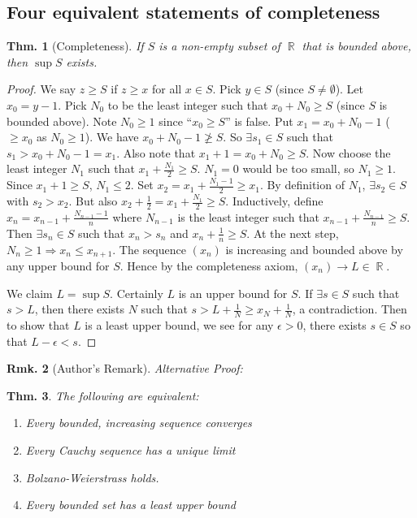 \documentclass[12pt, a4paper]{book}
\DeclareMathOperator{\R}{\mathbb{R}}
\newtheorem{theorem}{Thm.}[section]
\newtheorem{remark}[theorem]{Rmk.}
\theoremstyle{nonumberplain}
\newtheorem{proof}{Proof}
\begin{document}
\subsection{Four equivalent statements of completeness}
\begin{theorem}[Completeness]
    If $S$ is a non-empty subset of $\R$ that is bounded above, then $\sup S$ exists.
\end{theorem}
\begin{proof}
    We say $z\geq S$ if $z\geq x$ for all $x\in S$. Pick $y\in S$ (since $S\neq\emptyset$). Let $x_0=y-1$. Pick $N_0$ to
    be the least integer such that $x_0+N_0\geq S$ (since $S$ is bounded above). Note $N_0\geq 1$ since ``$x_0\geq S$''
    is false. Put $x_1=x_0+N_0-1$ ($\geq x_0$ as $N_0\geq 1$). We have $x_0+N_0-1\not\geq S$. So $\exists s_1\in S$ such
    that $s_1>x_0+N_0-1=x_1$. Also note that $x_1+1=x_0+N_0\geq S$. Now choose the least integer $N_1$ such that $x_1+\frac{N_1}{2}\geq S$.
    $N_1=0$ would be too small, so $N_1\geq 1$. Since $x_1+1\geq S$, $N_1\leq 2$. Set $x_2=x_1+\frac{N_1-1}{2}\geq x_1$.
    By definition of $N_1$, $\exists s_2\in S$ with $s_2>x_2$. But also $x_2+\frac{1}{2}=x_1+\frac{N_1}{2}\geq S$.
    Inductively, define $x_n=x_{n-1}+\frac{N_{n-1}-1}{n}$ where $N_{n-1}$ is the least integer such that $x_{n-1}+\frac{N_{n-1}}{n}\geq S$.
    Then $\exists s_n\in S$ such that $x_n>s_n$ and $x_n+\frac{1}{n}\geq S$. At the next step, $N_n\geq 1\Rightarrow x_n\leq x_{n+1}$.
    The sequence $(x_n)$ is increasing and bounded above by any upper bound for $S$. Hence by the completeness axiom,
    $(x_n)\to L\in\R$.

    We claim $L=\sup S$. Certainly $L$ is an upper bound for $S$. If $\exists s\in S$ such that $s>L$, then there exists
    $N$ such that $s>L+\frac{1}{N}\geq x_N+\frac{1}{N}$, a contradiction. Then to show that $L$ is a least upper bound,
    we see for any $\epsilon>0$, there exists $s\in S$ so that $L-\epsilon<s$.
\end{proof}
\begin{remark}[Author's Remark]
    \textit{Alternative Proof:}
\end{remark}
\begin{theorem}
    The following are equivalent:
    \begin{enumerate}
        \item Every bounded, increasing sequence converges
        \item Every Cauchy sequence has a unique limit
        \item Bolzano-Weierstrass holds.
        \item Every bounded set has a least upper bound
    \end{enumerate}
\end{theorem}
\end{document}
